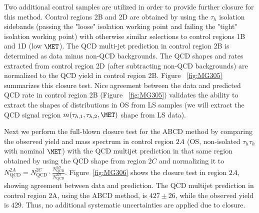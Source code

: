 Two additional control samples are utilized in order to provide further closure for this method. Control regions 2B and 2D are obtained by using
the $\tau_{h}$ isolation sidebands (passing the "loose" isolation working point and failing the "tight" isolation working point) with otherwise similar selections
to control regions 1B and 1D (low $\MET$). The QCD multi-jet prediction in control region 2B is determined as data minus non-QCD backgrounds. The QCD shapes and 
rates extracted from control region 2D (after subtracting non-QCD backgrounds) are normalized to the QCD yield in control region 2B. Figure ~\ref{fig:MG305} 
summarizes this closure test. Nice agreement between the data and predicted QCD rate in control region 2B (Figure ~\ref{fig:MG305}) validates the
ability to extract the shapes of distributions in OS from LS samples (we will extract the QCD signal region $m(\tau_{h,1},\tau_{h,2},\MET)$ shape from LS data).

Next we perform the full-blown closure test for the ABCD method by comparing the observed yield and mass spectrum in control region $2A$ (OS, non-isolated $\tau_{h}\tau_{h}$ with nominal $\MET$) with the QCD multijet prediction in that same region obtained by using the QCD shape from region $2C$ and normalizing it to $N_{\textrm{QCD}}^{2A} = N_{\textrm{QCD}}^{2C} \cdot \frac{N_{\textrm{QCD}}^{2B}}{N_{\textrm{QCD}}^{2D}}$. Figure~\ref{fig:MG306} shows the closure test in region $2A$, showing agreement between data and prediction. The QCD multijet prediction in control region 2A, using the ABCD method, is $427 \pm 26$, while the observed yield is $429$. Thus, no additional systematic uncertainties are applied due to closure.

